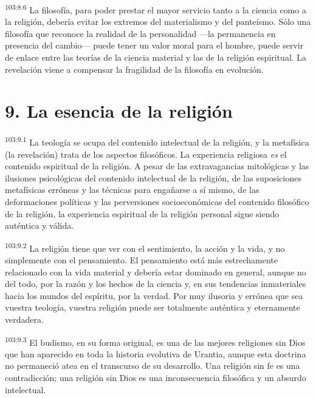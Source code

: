\documentclass[twoside, 11pt]{book}
\begin{document}
\par
\textsuperscript{103:8.6} La filosofía, para poder prestar el mayor servicio tanto a la ciencia como a la religión, debería evitar los extremos del materialismo y del panteísmo. Sólo una filosofía que reconoce la realidad de la personalidad ---la permanencia en presencia del cambio--- puede tener un valor moral para el hombre, puede servir de enlace entre las teorías de la ciencia material y las de la religión espiritual. La revelación viene a compensar la fragilidad de la filosofía en evolución.

\section*{9. La esencia de la religión}
\par
\textsuperscript{103:9.1} La teología se ocupa del contenido intelectual de la religión, y la metafísica (la revelación) trata de los aspectos filosóficos. La experiencia religiosa \textit{es} el contenido espiritual de la religión. A pesar de las extravagancias mitológicas y las ilusiones psicológicas del contenido intelectual de la religión, de las suposiciones metafísicas erróneas y las técnicas para engañarse a sí mismo, de las deformaciones políticas y las perversiones socioeconómicas del contenido filosófico de la religión, la experiencia espiritual de la religión personal sigue siendo auténtica y válida.

\par
\textsuperscript{103:9.2} La religión tiene que ver con el sentimiento, la acción y la vida, y no simplemente con el pensamiento. El pensamiento está más estrechamente relacionado con la vida material y debería estar dominado en general, aunque no del todo, por la razón y los hechos de la ciencia y, en sus tendencias inmateriales hacia los mundos del espíritu, por la verdad. Por muy ilusoria y errónea que sea vuestra teología, vuestra religión puede ser totalmente auténtica y eternamente verdadera.

\par
\textsuperscript{103:9.3} El budismo, en su forma original, es una de las mejores religiones sin Dios que han aparecido en toda la historia evolutiva de Urantia, aunque esta doctrina no permaneció atea en el transcurso de su desarrollo. Una religión sin fe es una contradicción; una religión sin Dios es una inconsecuencia filosófica y un absurdo intelectual.
\end{document}
